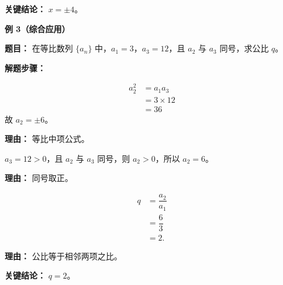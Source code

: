 \begin{examplebox}
	\textbf{\textcolor{CExample}{关键结论：}}
	$\boxed{x = \pm 4}$。

	\medskip
	\textbf{\textcolor{CExample}{例 3（综合应用）}}

	\textbf{\textcolor{CExample}{题目：}}
	在等比数列 $\{a_n\}$ 中，$a_1 = 3$，$a_3 = 12$，且 $a_2$ 与 $a_3$ 同号，求公比 $q$。

	\textbf{\textcolor{CExample}{解题步骤：}}
	\begin{description}[style=nextline, leftmargin=2.8em, labelsep=0.5em, itemsep=0.45em]
		\item[\textbf{第一步（求中间项）：}]
			\[
				\begin{aligned}
					a_2^2 &= a_1 a_3 \\
					&= 3 \times 12 \\
					&= 36
			\end{aligned}
			\]
			故 $a_2 = \pm 6$。
			\par\textbf{理由：} 等比中项公式。

		\item[\textbf{第二步（符号判定）：}] $a_3 = 12 > 0$，且 $a_2$ 与 $a_3$ 同号，则 $a_2 > 0$，所以 $a_2 = 6$。
			\par\textbf{理由：} 同号取正。

		\item[\textbf{第三步（求公比）：}]
			\[
				\begin{aligned}
					q &= \dfrac{a_2}{a_1} \\
					&= \dfrac{6}{3} \\
					&= 2.
			\end{aligned}
			\]
			\par\textbf{理由：} 公比等于相邻两项之比。
	\end{description}

	\textbf{\textcolor{CExample}{关键结论：}}
	$\boxed{q = 2}$。

\end{examplebox}
